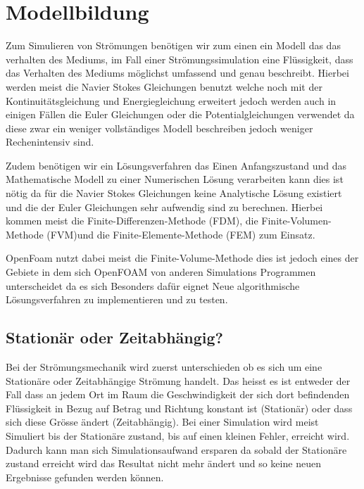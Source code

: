 %
%
%
%
\section{Modellbildung
\label{openfoam:section:teil1}}
Zum Simulieren von Strömungen benötigen wir zum einen ein Modell das das verhalten des Mediums, im Fall einer Strömungssimulation eine Flüssigkeit, dass das Verhalten des Mediums möglichst umfassend und genau beschreibt. 
Hierbei werden meist die Navier Stokes Gleichungen benutzt welche noch mit der Kontinuitätsgleichung und Energiegleichung erweitert jedoch werden auch in einigen Fällen die Euler Gleichungen oder die Potentialgleichungen verwendet da diese zwar ein weniger vollständiges Modell beschreiben jedoch weniger Rechenintensiv sind.

Zudem benötigen wir ein Lösungsverfahren das Einen Anfangszustand und das Mathematische Modell zu einer Numerischen Lösung verarbeiten kann dies ist nötig da für die Navier Stokes Gleichungen keine Analytische Lösung existiert und die der Euler Gleichungen sehr aufwendig sind zu berechnen. 
Hierbei kommen meist die Finite-Differenzen-Methode (FDM), die Finite-Volumen-Methode (FVM)und die Finite-Elemente-Methode (FEM) zum Einsatz. 

OpenFoam nutzt dabei meist die Finite-Volume-Methode dies ist jedoch eines der Gebiete in dem sich OpenFOAM von anderen Simulations Programmen unterscheidet da es sich Besonders dafür eignet Neue algorithmische Lösungsverfahren zu implementieren und zu testen.

\subsection{Stationär oder Zeitabhängig?}
Bei der Strömungsmechanik wird zuerst unterschieden ob es sich um eine Stationäre oder Zeitabhängige Strömung handelt.
Das heisst es ist entweder der Fall dass an jedem Ort im Raum die Geschwindigkeit der sich dort befindenden Flüssigkeit in Bezug auf Betrag und Richtung konstant ist (Stationär) oder dass sich diese Grösse ändert (Zeitabhängig).
Bei einer Simulation wird meist Simuliert bis der Stationäre zustand, bis auf einen kleinen Fehler, erreicht wird.
Dadurch kann man sich Simulationsaufwand ersparen da sobald der Stationäre zustand erreicht wird das Resultat nicht mehr ändert und so keine neuen Ergebnisse gefunden werden können.

